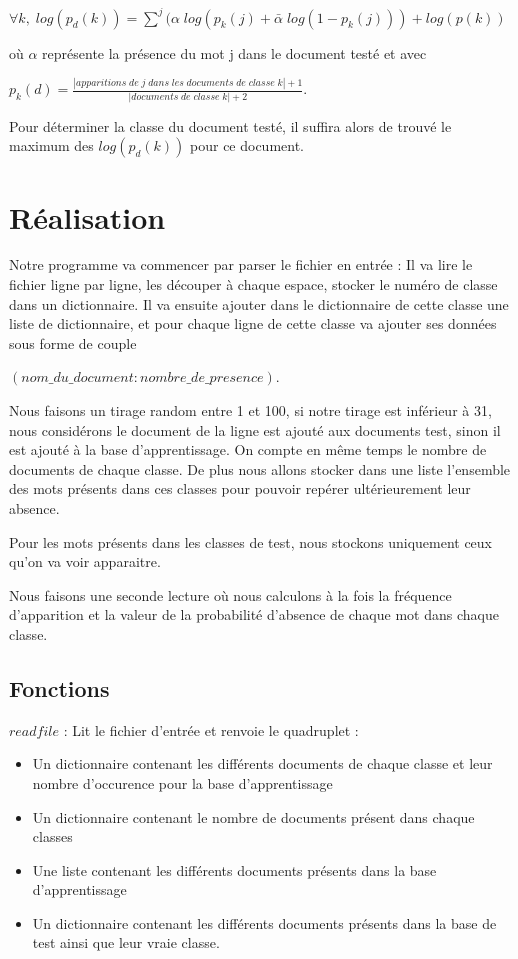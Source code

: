 \documentclass[a4paper,11pt]{article}
\begin{document}
$ \forall k,\; log(p_d(k)) = \sum\limits^{j} (\alpha \; log(p_k(j) +  \bar{\alpha} \; log(1-p_k(j))) + log(p(k)) $

où $\alpha$ représente la présence du mot j dans le document testé et avec 

$p_k(d) = \frac{|apparitions \; de \; j \; dans \; les \; documents \; de \;classe \;k| + 1}{|documents\; de\; classe\; k| + 2}$.

Pour déterminer la classe du document testé, il suffira alors de trouvé le maximum des $log(p_d(k))$ pour ce document.



\section{Réalisation}

Notre programme va commencer par parser le fichier en entrée :
Il va lire le fichier ligne par ligne, les découper à chaque espace, stocker le numéro de classe dans un dictionnaire.
Il va ensuite ajouter dans le dictionnaire de cette classe une liste de dictionnaire, et pour chaque ligne de cette classe va ajouter ses données sous forme de couple 

$(nom\_du\_document:nombre\_de\_presence)$.


Nous faisons un tirage random entre 1 et 100, si notre tirage est inférieur à 31, nous considérons le document de la ligne est ajouté aux documents test, sinon il est ajouté à la base d'apprentissage. On compte en même temps le nombre de documents de chaque classe.  De plus nous allons stocker dans une liste l'ensemble des mots présents dans ces classes pour pouvoir repérer ultérieurement leur absence.

Pour les mots présents dans les classes de test, nous stockons uniquement ceux qu'on va voir apparaitre.

Nous faisons une seconde lecture où nous calculons à la fois la fréquence d'apparition et la valeur de la probabilité d'absence de chaque mot dans chaque classe.

\subsection{Fonctions}
	$readfile$ : Lit le fichier d'entrée et renvoie le quadruplet :
	\begin{itemize}
	\item Un dictionnaire contenant les différents documents de chaque classe et leur nombre d'occurence pour la base d'apprentissage
	\item Un dictionnaire contenant le nombre de documents présent dans chaque classes
	\item Une liste contenant les différents documents présents dans la base d'apprentissage
	\item Un dictionnaire contenant les différents documents présents dans la base de test ainsi que leur vraie classe.
	\end{itemize}
	
\end{document}
